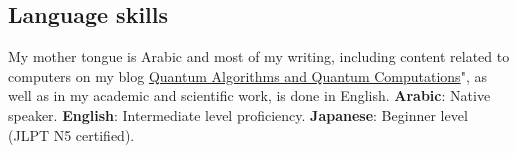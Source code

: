 \documentclass[margin,line]{resume}
\begin{document}
\begin{resume}
	\section{\mysidestyle Language skills}
	My mother tongue is Arabic and most of my writing, including content related to computers on my blog  \href{https://qaqcblog.quora.com/}{Quantum Algorithms and Quantum Computations}", as well as in my academic and scientific work, is done in English.
	\textbf{Arabic}: Native speaker.
	\textbf{English}: Intermediate level proficiency.
	\textbf{Japanese}: Beginner level (JLPT N5 certified).

\end{resume}
\end{document}
